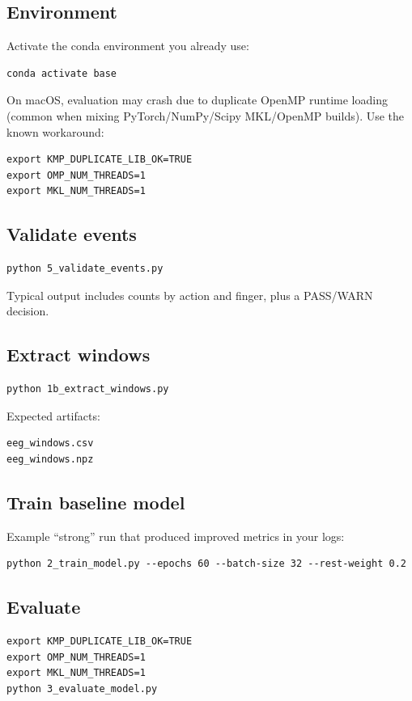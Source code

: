 \documentclass[11pt]{article}
\begin{document}
\subsection{Environment}
Activate the conda environment you already use:
\begin{lstlisting}
conda activate base
\end{lstlisting}

On macOS, evaluation may crash due to duplicate OpenMP runtime loading (common when mixing PyTorch/NumPy/Scipy MKL/OpenMP builds). Use the known workaround:
\begin{lstlisting}
export KMP_DUPLICATE_LIB_OK=TRUE
export OMP_NUM_THREADS=1
export MKL_NUM_THREADS=1
\end{lstlisting}

\subsection{Validate events}
\begin{lstlisting}
python 5_validate_events.py
\end{lstlisting}
Typical output includes counts by action and finger, plus a PASS/WARN decision.

\subsection{Extract windows}
\begin{lstlisting}
python 1b_extract_windows.py
\end{lstlisting}
Expected artifacts:
\begin{lstlisting}
eeg_windows.csv
eeg_windows.npz
\end{lstlisting}

\subsection{Train baseline model}
Example ``strong'' run that produced improved metrics in your logs:
\begin{lstlisting}
python 2_train_model.py --epochs 60 --batch-size 32 --rest-weight 0.2
\end{lstlisting}

\subsection{Evaluate}
\begin{lstlisting}
export KMP_DUPLICATE_LIB_OK=TRUE
export OMP_NUM_THREADS=1
export MKL_NUM_THREADS=1
python 3_evaluate_model.py
\end{lstlisting}
\end{document}
